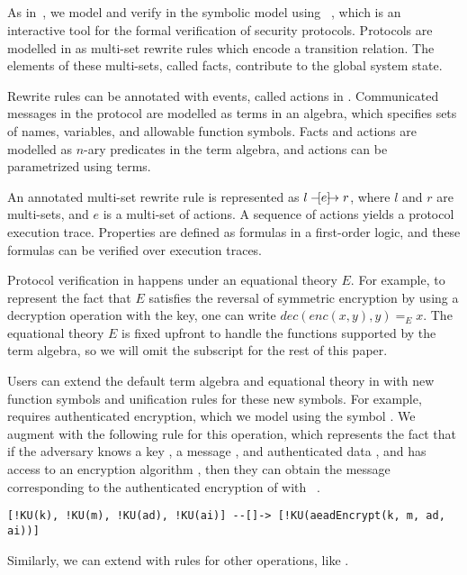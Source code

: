 \subsection{\mTamarin{}}
\label{sec:tamarin}
As in~\cite{Norr21}, we model and verify \mEdhoc{} in the symbolic model using \mTamarin{}~\cite{DBLP:conf/cav/MeierSCB13}, which is an interactive tool for the formal verification of security protocols.
%
Protocols are modelled in \mTamarin{} as multi-set rewrite rules which encode a transition relation.
%
The elements of these multi-sets, called facts, contribute to the global system state.

Rewrite rules can be annotated with events, called actions in \mTamarin{}.
%
Communicated messages in the protocol are modelled as terms in an algebra, which specifies sets of names, variables, and allowable function symbols.
%
Facts and actions are modelled as $n$-ary predicates in the term algebra, and actions can be parametrized using terms.

An annotated multi-set rewrite rule is represented as $l \ifarrow[e] r$, where $l$ and $r$ are multi-sets, and $e$ is a multi-set of actions.
%
A sequence of actions yields a protocol execution trace.
%
Properties are defined as formulas in a first-order logic, and these formulas can be verified over execution traces.

Protocol verification in \mTamarin{} happens under an equational theory $E$.
%
For example, to represent the fact that $E$ satisfies the reversal of symmetric encryption by using a decryption operation with the key, one can write $\textit{dec}(\textit{enc}(x, y), y) =_{E} x$. 
%
The equational theory $E$ is fixed upfront to handle the functions supported by the term algebra, so we will omit the subscript for the rest of this paper.
%

Users can extend the default term algebra and equational theory in \mTamarin{} with new function symbols and unification rules for these new symbols.
%
For example, \mEdhoc{} requires authenticated encryption, which we model using the symbol . 
%
We augment \mTamarin{} with the following rule for this operation, which represents the fact that if the adversary knows a key , a message , and authenticated data , and has access to an encryption algorithm , then they can obtain the message corresponding to the authenticated encryption of  with ~\cite{Norr21}.
\begin{verbatim}
[!KU(k), !KU(m), !KU(ad), !KU(ai)] --[]-> [!KU(aeadEncrypt(k, m, ad, ai))]
\end{verbatim}
%
Similarly, we can extend \mTamarin{} with rules for other operations, like \mXor{}.

